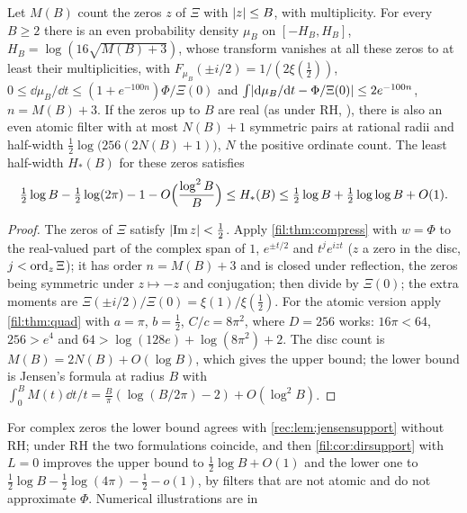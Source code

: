 \begin{theorem}\label{fil:thm:zetaexplicit}
Let $M(B)$ count the zeros $z$ of $\Xi$ with $\lvert z\rvert\le B$, with multiplicity. For every $B\ge2$ there is an even
probability density $\mu_B$ on $[-H_B,H_B]$, $H_B=\log(16\sqrt{M(B)+3})$, whose transform vanishes at all these zeros
to at least their multiplicities, with $F_{\mu_B}(\pm i/2)=1/(2\xi(\tfrac12))$,
$0\le\dd\mu_B/\dd t\le(1+e^{-100n})\Phi/\Xi(0)$ and $\int\lvert\mathrm{d}\mu_B/\mathrm{d} t-\Phi/\Xi(0)\rvert\le2e^{-100n}$, $n=M(B)+3$.
If the zeros up to $B$ are real (as under RH, \stG), there is also an even atomic filter with at most
$N(B)+1$ symmetric pairs at rational radii and half-width $\tfrac12\log\bigl(256(2N(B)+1)\bigr)$, $N$ the positive
ordinate count. The least half-width $H_*(B)$ for these zeros satisfies
\[
 \tfrac12\log B-\tfrac12\log(2\pi)-1-O\Bigl(\frac{\log^2B}B\Bigr)\le H_*(B)\le\tfrac12\log B+\tfrac12\log\log B+O(1).
\]
\end{theorem}

\begin{proof}
The zeros of $\Xi$ satisfy $\lvert\operatorname{Im} z\rvert<\tfrac12$. Apply \cref{fil:thm:compress} with $w=\Phi$ to the real-valued part of the complex
span of $1$, $e^{\pm t/2}$ and $t^je^{izt}$ ($z$ a zero in the disc, $j<\operatorname{ord}_z\Xi$); it has order $n=M(B)+3$ and is
closed under reflection, the zeros being symmetric under $z\mapsto-z$ and conjugation; then divide by
$\Xi(0)$; the extra moments are $\Xi(\pm i/2)/\Xi(0)=\xi(1)/\xi(\tfrac12)$. For the atomic version apply
\cref{fil:thm:quad} with $a=\pi$, $b=\tfrac12$, $C/c=8\pi^2$, where $D=256$ works:
$16\pi<64$, $256>e^4$ and $64>\log(128e)+\log(8\pi^2)+2$. The disc count is $M(B)=2N(B)+O(\log B)$, which gives the
upper bound; the lower bound is Jensen's formula at radius $B$ with
$\int_0^BM(t)\dd t/t=\frac B\pi(\log(B/2\pi)-2)+O(\log^2B)$.
\end{proof}

For complex zeros the lower bound agrees with \cref{rec:lem:jensensupport} without RH; under RH the two
formulations coincide, and then \cref{fil:cor:dirsupport} with $L=0$ improves the upper bound to
$\tfrac12\log B+O(1)$ and the lower one to $\tfrac12\log B-\tfrac12\log(4\pi)-\tfrac12-o(1)$, by
filters that are not atomic and do not approximate $\Phi$. Numerical illustrations are in
\begin{center}\\
\end{center}

